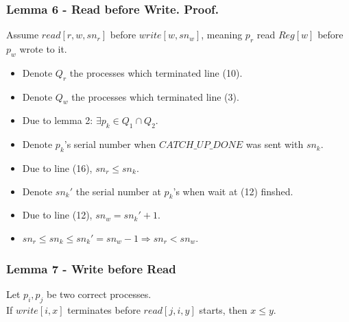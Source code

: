 \begin{frame}
    \frametitle{Lemma 6 - Read before Write. Proof.}

        Assume $read[r,w,sn_r]$ before $write[w,sn_w]$, meaning $p_r$ read $Reg[w]$
        before $p_w$ wrote to it.
        \begin{itemize}
            \item Denote $Q_r$ the processes which terminated line (10).
            \item Denote $Q_w$ the processes which terminated line (3).
            \item Due to lemma 2: $\exists p_k\in Q_1\cap Q_2$.
            \item Denote $p_k$'s serial number when $CATCH\_UP\_DONE$ was sent with $sn_k$. 
            \item Due to line (16), $sn_r\leq sn_k$.
            \item Denote $sn_k'$ the serial number at $p_k$'s when wait at (12) finshed.
            \item Due to line (12), $sn_w=sn_k'+1$.
            \item $sn_r\leq sn_k\leq sn_k'= sn_w-1\Rightarrow sn_r < sn_w$.
        \end{itemize}

\end{frame}
\begin{frame}
    \frametitle{Lemma 7 - Write before Read}
    \begin{lemma}
        Let $p_i, p_j$ be two correct processes.\\
        If $write[i,x]$ terminates before $read[j,i,y]$ starts, then $x\leq y$.
    \end{lemma}
\end{frame}
